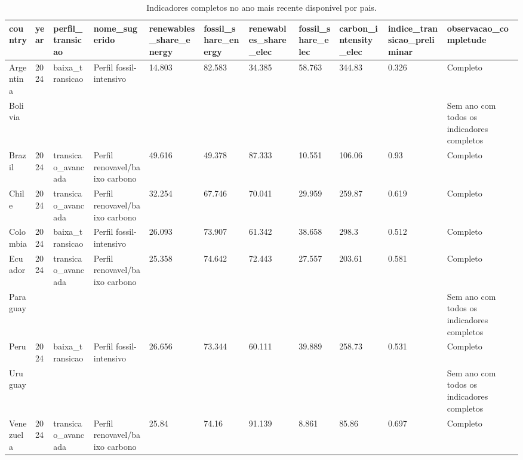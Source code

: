 \begin{table}[htbp]
\centering
\caption{Indicadores completos no ano mais recente disponivel por pais.}
\label{tab:paises-ano-recente-indicadores-completos}
\begin{tabular}{lllllllllll}
\hline
country & year & perfil\_transicao & nome\_sugerido & renewables\_share\_energy & fossil\_share\_energy & renewables\_share\_elec & fossil\_share\_elec & carbon\_intensity\_elec & indice\_transicao\_preliminar & observacao\_completude \\
\hline
Argentina & 2024 & baixa\_transicao & Perfil fossil-intensivo & 14.803 & 82.583 & 34.385 & 58.763 & 344.83 & 0.326 & Completo \\
Bolivia &  &  &  &  &  &  &  &  &  & Sem ano com todos os indicadores completos \\
Brazil & 2024 & transicao\_avancada & Perfil renovavel/baixo carbono & 49.616 & 49.378 & 87.333 & 10.551 & 106.06 & 0.93 & Completo \\
Chile & 2024 & transicao\_avancada & Perfil renovavel/baixo carbono & 32.254 & 67.746 & 70.041 & 29.959 & 259.87 & 0.619 & Completo \\
Colombia & 2024 & baixa\_transicao & Perfil fossil-intensivo & 26.093 & 73.907 & 61.342 & 38.658 & 298.3 & 0.512 & Completo \\
Ecuador & 2024 & transicao\_avancada & Perfil renovavel/baixo carbono & 25.358 & 74.642 & 72.443 & 27.557 & 203.61 & 0.581 & Completo \\
Paraguay &  &  &  &  &  &  &  &  &  & Sem ano com todos os indicadores completos \\
Peru & 2024 & baixa\_transicao & Perfil fossil-intensivo & 26.656 & 73.344 & 60.111 & 39.889 & 258.73 & 0.531 & Completo \\
Uruguay &  &  &  &  &  &  &  &  &  & Sem ano com todos os indicadores completos \\
Venezuela & 2024 & transicao\_avancada & Perfil renovavel/baixo carbono & 25.84 & 74.16 & 91.139 & 8.861 & 85.86 & 0.697 & Completo \\
\hline
\end{tabular}
\end{table}
